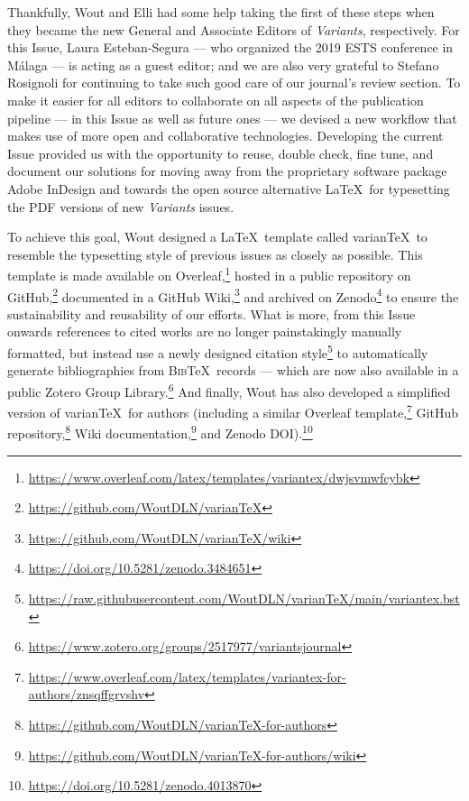 \begin{preface}
Thankfully, Wout and Elli had some help taking the first of these steps when they became the new General and Associate Editors of \emph{Variants}, respectively. 
For this Issue, Laura Esteban-Segura --- who organized the 2019 ESTS conference in Málaga --- is acting as a guest editor; and we are also very grateful to Stefano Rosignoli for continuing to take such good care of our journal's review section. 
To make it easier for all editors to collaborate on all aspects of the publication pipeline --- in this Issue as well as future ones --- we devised a new workflow that makes use of more open and collaborative technologies. 
Developing the current Issue provided us with the opportunity to reuse, double check, fine tune, and document our solutions for moving away from the proprietary software package Adobe InDesign\textsuperscript{\textregistered} and towards the open source alternative \LaTeX ~for typesetting the PDF versions of new \emph{Variants} issues. 

To achieve this goal, Wout designed a \LaTeX ~template called varian\TeX ~to resemble the typesetting style of previous issues as closely as possible. 
This template is made available on Overleaf,\footnote{\url{https://www.overleaf.com/latex/templates/variantex/dwjsvmwfcybk}} hosted in a public repository on GitHub,\footnote{\url{https://github.com/WoutDLN/varianTeX}} documented in a GitHub Wiki,\footnote{\url{https://github.com/WoutDLN/varianTeX/wiki}} and archived on Zenodo\footnote{\url{https://doi.org/10.5281/zenodo.3484651}} to ensure the sustainability and reusability of our efforts. 
What is more, from this Issue onwards references to cited works are no longer painstakingly manually formatted, but instead use a newly designed citation style\footnote{\url{https://raw.githubusercontent.com/WoutDLN/varianTeX/main/variantex.bst}} to automatically generate bibliographies from \textsc{Bib}\negthinspace\TeX ~records --- which are now also available in a public Zotero Group Library.\footnote{\url{https://www.zotero.org/groups/2517977/variantsjournal}} 
And finally, Wout has also developed a simplified version of varian\TeX ~for authors (including a similar Overleaf template,\footnote{\url{https://www.overleaf.com/latex/templates/variantex-for-authors/znsqffgrvshv}} GitHub repository,\footnote{\url{https://github.com/WoutDLN/varianTeX-for-authors}} Wiki documentation,\footnote{\url{https://github.com/WoutDLN/varianTeX-for-authors/wiki}} and Zenodo DOI).\footnote{\url{https://doi.org/10.5281/zenodo.4013870}} 


\end{preface}
